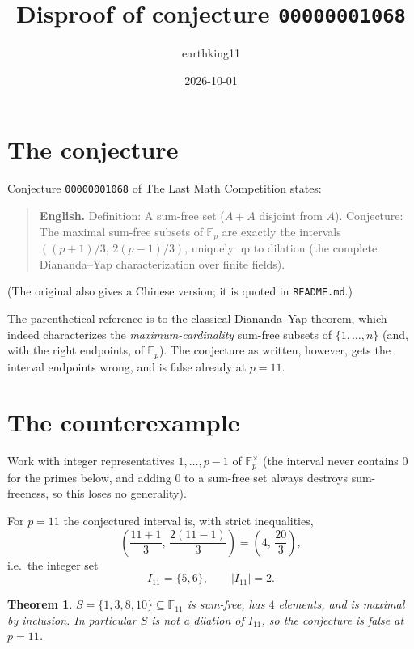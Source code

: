 \documentclass[11pt]{article}
\title{Disproof of conjecture \texttt{00000001068}}
\author{earthking11}
\date{2026-10-01}
\newtheorem{theorem}{Theorem}
\begin{document}
\maketitle

\section{The conjecture}

Conjecture \texttt{00000001068} of The Last Math Competition states:

\begin{quote}
\textbf{English.} Definition: A sum-free set ($A + A$ disjoint from $A$).
Conjecture: The maximal sum-free subsets of $\mathbb{F}_p$ are exactly the
intervals $((p+1)/3,\, 2(p-1)/3)$, uniquely up to dilation (the complete
Diananda--Yap characterization over finite fields).
\end{quote}
(The original also gives a Chinese version; it is quoted in \texttt{README.md}.)

The parenthetical reference is to the classical Diananda--Yap theorem, which
indeed characterizes the \emph{maximum-cardinality} sum-free subsets of
$\{1,\dots,n\}$ (and, with the right endpoints, of $\mathbb{F}_p$). The
conjecture as written, however, gets the interval endpoints wrong, and is
false already at $p = 11$.

\section{The counterexample}

Work with integer representatives $1, \dots, p-1$ of $\mathbb{F}_p^\times$
(the interval never contains $0$ for the primes below, and adding $0$ to a
sum-free set always destroys sum-freeness, so this loses no generality).

For $p = 11$ the conjectured interval is, with strict inequalities,
\[
\left(\frac{11+1}{3},\, \frac{2(11-1)}{3}\right) = \left(4,\, \frac{20}{3}\right),
\]
i.e.\ the integer set
\[
I_{11} = \{5, 6\}, \qquad |I_{11}| = 2.
\]

\begin{theorem}
$S = \{1, 3, 8, 10\} \subseteq \mathbb{F}_{11}$ is sum-free, has $4$ elements,
and is maximal by inclusion. In particular $S$ is not a dilation of $I_{11}$,
so the conjecture is false at $p = 11$.
\end{theorem}
\end{document}
